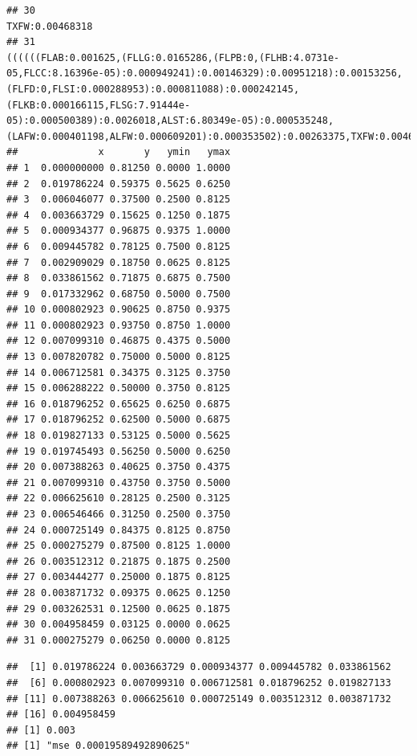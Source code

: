 \documentclass[]{article}
\begin{document}
\begin{verbatim}
## 30                                                                                                                                                                                                                                                                                                                                                                                                                            TXFW:0.00468318
## 31                                                                        ((((((FLAB:0.001625,(FLLG:0.0165286,(FLPB:0,(FLHB:4.0731e-05,FLCC:8.16396e-05):0.000949241):0.00146329):0.00951218):0.00153256,(FLFD:0,FLSI:0.000288953):0.000811088):0.000242145,(FLKB:0.000166115,FLSG:7.91444e-05):0.000500389):0.0026018,ALST:6.80349e-05):0.000535248,(LAFW:0.000401198,ALFW:0.000609201):0.000353502):0.00263375,TXFW:0.00468318):0.000275279
##              x       y   ymin   ymax
## 1  0.000000000 0.81250 0.0000 1.0000
## 2  0.019786224 0.59375 0.5625 0.6250
## 3  0.006046077 0.37500 0.2500 0.8125
## 4  0.003663729 0.15625 0.1250 0.1875
## 5  0.000934377 0.96875 0.9375 1.0000
## 6  0.009445782 0.78125 0.7500 0.8125
## 7  0.002909029 0.18750 0.0625 0.8125
## 8  0.033861562 0.71875 0.6875 0.7500
## 9  0.017332962 0.68750 0.5000 0.7500
## 10 0.000802923 0.90625 0.8750 0.9375
## 11 0.000802923 0.93750 0.8750 1.0000
## 12 0.007099310 0.46875 0.4375 0.5000
## 13 0.007820782 0.75000 0.5000 0.8125
## 14 0.006712581 0.34375 0.3125 0.3750
## 15 0.006288222 0.50000 0.3750 0.8125
## 16 0.018796252 0.65625 0.6250 0.6875
## 17 0.018796252 0.62500 0.5000 0.6875
## 18 0.019827133 0.53125 0.5000 0.5625
## 19 0.019745493 0.56250 0.5000 0.6250
## 20 0.007388263 0.40625 0.3750 0.4375
## 21 0.007099310 0.43750 0.3750 0.5000
## 22 0.006625610 0.28125 0.2500 0.3125
## 23 0.006546466 0.31250 0.2500 0.3750
## 24 0.000725149 0.84375 0.8125 0.8750
## 25 0.000275279 0.87500 0.8125 1.0000
## 26 0.003512312 0.21875 0.1875 0.2500
## 27 0.003444277 0.25000 0.1875 0.8125
## 28 0.003871732 0.09375 0.0625 0.1250
## 29 0.003262531 0.12500 0.0625 0.1875
## 30 0.004958459 0.03125 0.0000 0.0625
## 31 0.000275279 0.06250 0.0000 0.8125
\end{verbatim}

\begin{verbatim}
##  [1] 0.019786224 0.003663729 0.000934377 0.009445782 0.033861562
##  [6] 0.000802923 0.007099310 0.006712581 0.018796252 0.019827133
## [11] 0.007388263 0.006625610 0.000725149 0.003512312 0.003871732
## [16] 0.004958459
## [1] 0.003
## [1] "mse 0.00019589492890625"
\end{verbatim}
\end{document}
